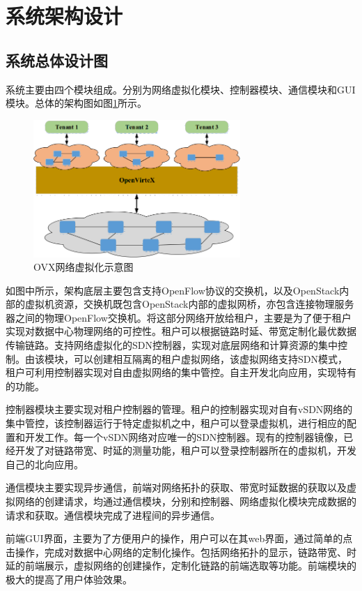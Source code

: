 \section{系统架构设计}
\subsection{系统总体设计图}
系统主要由四个模块组成。分别为网络虚拟化模块、控制器模块、通信模块和GUI模块。总体的架构图如图\ref{fig:ovx}所示。

\begin{figure}[!htb]
  \centering
  \includegraphics[width=0.7\textwidth]{logo/ovx.png}
  \caption{OVX网络虚拟化示意图}
  \label{fig:ovx}
\end{figure}

如图中所示，架构底层主要包含支持OpenFlow协议的交换机，以及OpenStack内部的虚拟机资源，交换机既包含OpenStack内部的虚拟网桥，亦包含连接物理服务器之间的物理OpenFlow交换机。将这部分网络开放给租户，主要是为了便于租户实现对数据中心物理网络的可控性。租户可以根据链路时延、带宽定制化最优数据传输链路。支持网络虚拟化的SDN控制器，实现对底层网络和计算资源的集中控制。由该模块，可以创建相互隔离的租户虚拟网络，该虚拟网络支持SDN模式，租户可利用控制器实现对自由虚拟网络的集中管控。自主开发北向应用，实现特有的功能。

控制器模块主要实现对租户控制器的管理。租户的控制器实现对自有vSDN网络的集中管控，该控制器运行于特定虚拟机之中，租户可以登录虚拟机，进行相应的配置和开发工作。每一个vSDN网络对应唯一的SDN控制器。现有的控制器镜像，已经开发了对链路带宽、时延的测量功能，租户可以登录控制器所在的虚拟机，开发自己的北向应用。

通信模块主要实现异步通信，前端对网络拓扑的获取、带宽时延数据的获取以及虚拟网络的创建请求，均通过通信模块，分别和控制器、网络虚拟化模块完成数据的请求和获取。通信模块完成了进程间的异步通信。

前端GUI界面，主要为了方便用户的操作，用户可以在其web界面，通过简单的点击操作，完成对数据中心网络的定制化操作。包括网络拓扑的显示，链路带宽、时延的前端展示，虚拟网络的创建操作，定制化链路的前端选取等功能。前端模块的极大的提高了用户体验效果。

